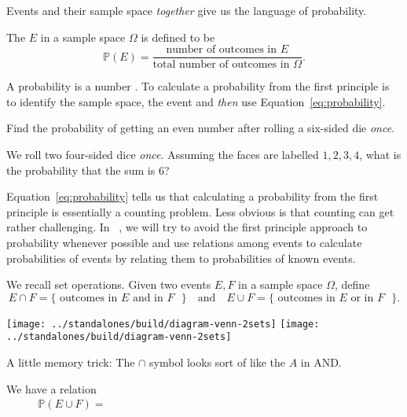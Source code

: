 \documentclass[../main.tex]{subfiles}
\begin{document}
Events and their sample space \emph{together} give us the language of probability.
\begin{definition}[probability]
  The  \(E\) in a sample space \(\Omega\) is defined to be
  \begin{equation} \label{eq:probability}
    \mathbb{P}(E) = \frac{\text{number of outcomes in \(E\)}}{\text{total number of outcomes in \(\Omega\)}}.
  \end{equation}
\end{definition}
A probability is a number \underline{\hspace{3in}}. To calculate a probability from the first principle is to identify the sample space, the event and \emph{then} use Equation~\eqref{eq:probability}.
\begin{example}
  Find the probability of getting an even number after rolling a six-sided die \emph{once}.
\end{example}
\clearpage

\begin{example}
  We roll two four-sided dice \emph{once}.  Assuming the faces are labelled \(1,2,3,4\), what is the probability that the sum is \(6\)?

\end{example}


\faStar{} Equation~\eqref{eq:probability} tells us that calculating a probability from the first principle is essentially a counting problem. Less obvious is that counting can get rather challenging. In \thecoursesubject~\thecoursenumb, we will try to avoid the first principle approach to probability whenever possible and use relations among events to calculate probabilities of events by relating them to probabilities of known events.

We recall set operations. Given two events \(E,F\) in a sample space \(\Omega\), define
\[
  E \cap F = \{\text{ outcomes in \(E\) and in \(F\) } \} \quad\text{and}\quad
  E \cup F = \{\text{ outcomes in \(E\) or in \(F\) } \}.
\]
\begin{center}
  \texttt{[image: ../standalones/build/diagram-venn-2sets]}
  \hspace{3em}
  \texttt{[image: ../standalones/build/diagram-venn-2sets]}
\end{center}
{\footnotesize A little memory trick: The \(\cap\) symbol looks sort of like the \(A\) in AND.}

\faStar{} We have a relation
\begin{align} \label{eq:probability-cup-cap}
  \mathbb{P}( E \cup F ) = \hspace{4in}
\end{align}
\end{document}
